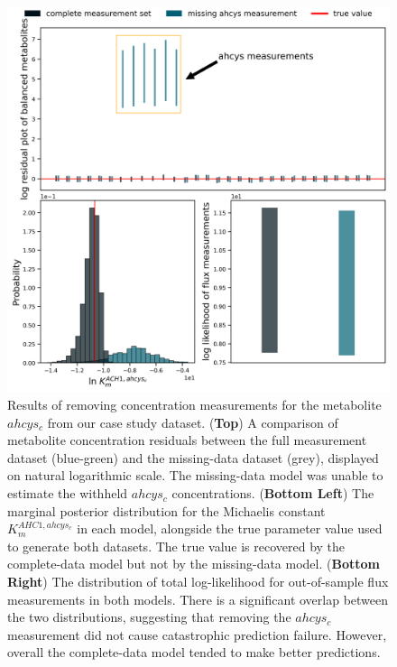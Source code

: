 \documentclass[journal=asbcd6,manuscript=article,layout=traditional]{achemso}
\begin{document}
\begin{figure}

\begin{minipage}{\linewidth}

\includegraphics{./figures/missing.png}

\end{minipage}%

\caption{\label{fig-missing}Results of removing concentration
measurements for the metabolite \(ahcys_c\) from our case study dataset.
(\textbf{Top}) A comparison of metabolite concentration residuals
between the full measurement dataset (blue-green) and the missing-data
dataset (grey), displayed on natural logarithmic scale. The missing-data
model was unable to estimate the withheld \(ahcys_c\) concentrations.
(\textbf{Bottom Left}) The marginal posterior distribution for the
Michaelis constant \(K_m^{AHC1,ahcys_c}\) in each model, alongside the
true parameter value used to generate both datasets. The true value is
recovered by the complete-data model but not by the missing-data model.
(\textbf{Bottom Right}) The distribution of total log-likelihood for
out-of-sample flux measurements in both models. There is a significant
overlap between the two distributions, suggesting that removing the
\(ahcys_c\) measurement did not cause catastrophic prediction failure.
However, overall the complete-data model tended to make better
predictions.}

\end{figure}%
\end{document}
